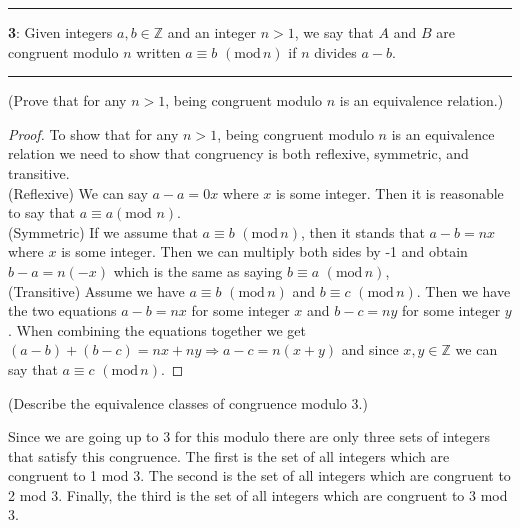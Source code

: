 \documentclass[11pt]{article}
\newcommand\question[2]{\vspace{.25in}\hrule\textbf{#1}: #2\vspace{.5em}\hrule\vspace{.10in}}
\renewcommand\part[1]{\vspace{.10in}(#1)\par}
\newcommand{\Z}{\mathbb{Z}}
\begin{document}
\question{3}{Given integers $a,b \in \Z$ and an integer $n > 1$, we say that $A$ and $B$ are congruent modulo $n$ written $a\equiv b\,\,(\text{mod}\,n)$ if $n$ divides $a-b$.}

\part{Prove that for any $n>1$, being congruent modulo $n$ is an equivalence relation.}

\begin{proof}
	To show that for any $n>1$, being congruent modulo $n$ is an equivalence relation we need to show that congruency is both reflexive, symmetric, and transitive.\\
	(Reflexive) We can say $a-a=0x$ where $x$ is some integer. Then it is reasonable to say that $a \equiv a(\text{mod }n)$.\\
	(Symmetric) If we assume that $a\equiv b\,\,(\text{mod}\,n)$, then it stands that $a-b=nx$ where $x$ is some integer. Then we can multiply both sides by -1 and obtain $b-a=n(-x)$ which is the same as saying $b\equiv a\,\,(\text{mod}\,n)$,\\
	(Transitive) Assume we have $a\equiv b\,\,(\text{mod}\,n)$ and $b\equiv c\,\,(\text{mod}\,n)$. Then we have the two equations $a-b=nx$ for some integer $x$ and $b-c=ny$ for some integer $y$. When combining the equations together we get $(a-b)+(b-c) = nx + ny \Rightarrow a-c=n(x+y)$ and since $x,y \in \Z$ we can say that $a\equiv c\,\,(\text{mod}\,n)$.
\end{proof}

\part{Describe the equivalence classes of congruence modulo 3.}
 	Since we are going up to 3 for this modulo there are only three sets of integers that satisfy this congruence. The first is the set of all integers which are congruent to 1 mod 3. The second is the set of all integers which are congruent to 2 mod 3. Finally, the third is the set of all integers which are congruent to 3 mod 3.




	
\end{document}
